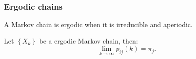 \begin{frame}
	\frametitle{Ergodic chains}
	\begin{definition}[Ergodicity]
		A Markov chain is ergodic when it is irreducible and aperiodic.
	\end{definition}
	\begin{theorem}
		Let $\left\{X_k\right\}$ be a ergodic Markov chain, then:
		\begin{equation*}
		\lim_{k \rightarrow \infty} p_{ij}(k) = \pi_j.
		\end{equation*}
	\end{theorem}
\end{frame}